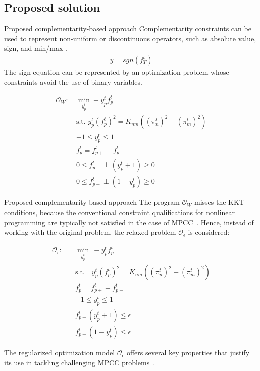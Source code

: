 \documentclass[hyperref={colorlinks,citecolor=blue,linkcolor=blue,urlcolor=blue}]{beamer}
\begin{document}
\subsection{Proposed solution}
\begin{frame}{Proposed complementarity-based approach}
     Complementarity constraints can be used to represent non-uniform or discontinuous operators, such as absolute value, sign, and min/max \cite{mpcc}.
    \begin{gather}
            y = sgn(f_{T}^t)  \label{eq:sign}
    \end{gather}
    The sign equation can be represented by an optimization problem whose constraints avoid the use of binary variables.

\begin{subequations}
\begin{alignat}{4}
\label{eq:complementarity_relaxec3}
\mathcal{O}_W: \ &\min\limits_{y_p^t} -y_p^tf_{p}^t \\
& \text{s.t. } y_p^t(f_{p}^t)^2 = K_{nm}((\pi_{n}^t)^2-(\pi_{m}^t)^2)\\
& -1 \leq y_p^t \leq 1 \\
&f_{p}^t = f_{p+}^t - f_{p-}^t\\
& 0 \leq f_{p+}^t \perp (y_p^t+1) \geq 0 \\
& 0 \leq f_{p-}^t \perp (1-y_p^t) \geq 0
\end{alignat}
\end{subequations}

\end{frame}


\begin{frame}{Proposed complementarity-based approach}
   The program $\mathcal{O}_W$ misses the KKT conditions, because the conventional constraint qualifications for nonlinear programming are typically not satisfied in the case of MPCC~\cite{Bouza_Still_2007}. Hence, instead of working with the original problem, the relaxed problem $\mathcal{O}_\epsilon$ is considered:


\begin{subequations}
\begin{align}
\mathcal{O}_\epsilon: \quad &\min\limits_{y_p^t} \ -y_p^t f_p^t \label{eq:complementarity_relaxec1} \\
&\text{s.t.} \quad y_p^t (f_p^t)^2 = K_{nm} \left( (\pi_n^t)^2 - (\pi_m^t)^2 \right) \\
&f_p^t = f_{p+}^t - f_{p-}^t \\
&-1 \leq y_p^t \leq 1 \\
&f_{p+}^t (y_p^t + 1) \leq \epsilon \label{eq:Oe:complementarity1} \\
&f_{p-}^t (1 - y_p^t) \leq \epsilon \label{eq:Oe:complementarity2}
\end{align}
\end{subequations}

The regularized optimization model $\mathcal{O}_{\epsilon}$ offers several key properties that justify its use in tackling challenging MPCC problems~\cite{Ralph_Wright_2004}.
\end{frame}
\end{document}
